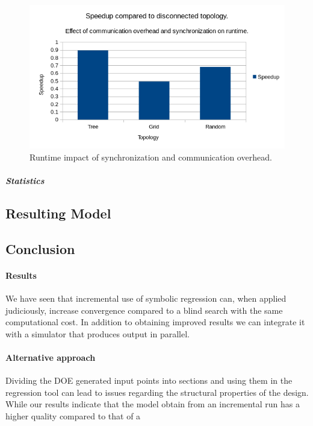 \begin{figure}
    \centering
    \includegraphics[width=\textwidth,height=\textheight,keepaspectratio]{figures/usecasespeedup.png}
    \caption{Runtime impact of synchronization and communication overhead.}
    \label{fig:usecasespeedup}
\end{figure}
\subparagraph{Statistics}
\subsection{Resulting Model}
\subsection{Conclusion}
\paragraph{Results}
We have seen that incremental use of symbolic regression can, when applied judiciously, increase convergence compared to a blind search with the same computational cost. In addition to obtaining improved results we can integrate it with a simulator that produces output in parallel.
\paragraph{Alternative approach}
Dividing the DOE generated input points into sections and using them in the regression tool can lead to issues regarding the structural properties of the design. While our results indicate that the model obtain from an incremental run has a higher quality compared to that  of a 
